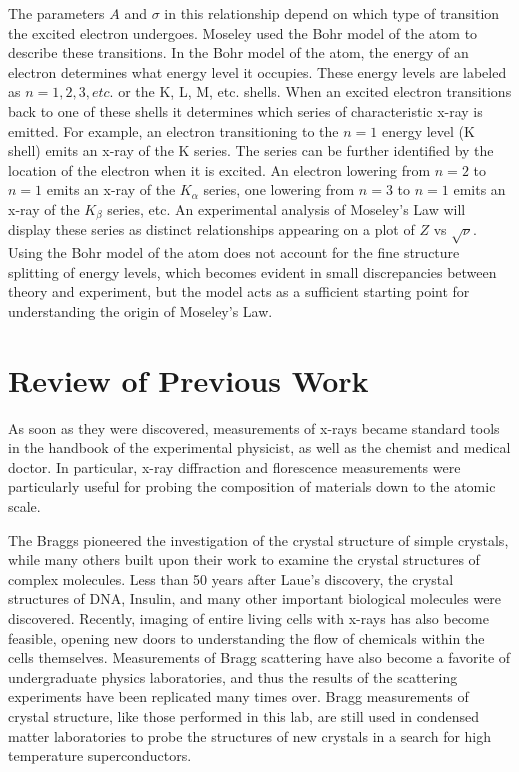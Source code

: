 \documentclass[%
 reprint,
 amsmath,amssymb,
 aps,
 pra,
]{revtex4-1}
\begin{document}
The parameters $A$ and $\sigma$ in this relationship depend on which type of transition the excited electron undergoes. Moseley used the Bohr model of the atom to describe these transitions. In the Bohr model of the atom, the energy of an electron determines what energy level it occupies. These energy levels are labeled as $n = 1, 2, 3, etc.$ or the K, L, M, etc. shells. When an excited electron transitions back to one of these shells it determines which series of characteristic x-ray is emitted. For example, an electron transitioning to the $n = 1$ energy level (K shell) emits an x-ray of the K series. The series can be further identified by the location of the electron when it is excited. An electron lowering from $n = 2$ to $n = 1$ emits an x-ray of the $K_{\alpha}$ series, one lowering from $n = 3$ to $n = 1$ emits an x-ray of the $K_{\beta}$ series, etc. An experimental analysis of Moseley's Law will display these series as distinct relationships appearing on a plot of $Z$ vs $\sqrt{\nu}$. Using the Bohr model of the atom does not account for the fine structure splitting of energy levels, which becomes evident in small discrepancies between theory and experiment, but the model acts as a sufficient starting point for understanding the origin of Moseley's Law.

\section{Review of Previous Work}

As soon as they were discovered, measurements of x-rays became standard tools in the handbook of the experimental physicist, as well as the chemist and medical doctor. In particular, x-ray diffraction and florescence measurements were particularly useful for probing the composition of materials down to the atomic scale. 

The Braggs pioneered the investigation of the crystal structure of simple crystals\cite{bragg, xray_history}, while many others built upon their work to examine the crystal structures of complex molecules. Less than 50 years after Laue's discovery, the crystal structures of DNA\cite{dna1, dna2}, Insulin\cite{insulin}, and many other important biological molecules were discovered\cite{scatter_medicine_1, scatter_medicine_2}. Recently, imaging of entire living cells with x-rays has also become feasible, opening new doors to understanding the flow of chemicals within the cells themselves\cite{whole_cells}. Measurements of Bragg scattering have also become a favorite of undergraduate physics laboratories, and thus the results of the scattering experiments have been replicated many times over\cite{scatter_lab_1, scatter_lab_2, jensen}. Bragg measurements of crystal structure, like those performed in this lab, are still used in condensed matter laboratories to probe the structures of new crystals in a search for high temperature superconductors\cite{aronson}.
\end{document}
